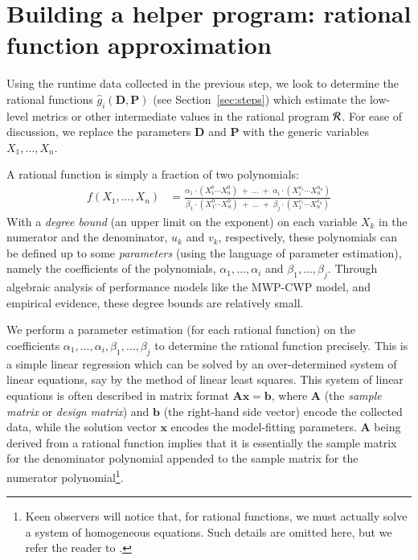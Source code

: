 \section{Building a helper program: rational function approximation}
\label{sec:paramest}

Using the runtime data collected in the previous step, 
we look to determine the rational functions
$\hat{g}_i(\bm{D},\bm{P})$ (see Section~\ref{sec:steps})
which estimate the low-level metrics or other intermediate 
values in the rational program ${\cal R}$. For ease of
discussion, we replace the parameters $\bm{D}$ and $\bm{P}$
with the generic variables $X_1,\ldots,X_n$.

A rational function is simply a fraction of two polynomials: 
{
	\small
		\begin{align}
		f(X_1,\dots,X_n) &= \frac{\alpha_1\cdot(X_1^0\cdots X_n^0) \;+\; 
			\dots \;+\;  \alpha_i\cdot(X_1^{u_1}\cdots X_n^{u_n})}{\beta_1\cdot(X_1^0\cdots X_n^0) \;+\;
			\dots \;+\; \beta_j\cdot(X_1^{v_1}\cdots X_n^{v_n})}
		\end{align}
}
With a \textit{degree bound} (an upper limit on the exponent) on each
variable $X_k$ in the numerator and the denominator,
$u_k$ and $v_k$, respectively, these polynomials can be defined up to
some \textit{parameters} (using the language of parameter estimation), namely the coefficients of the polynomials,
$\alpha_1,\dots,\alpha_i$ and $\beta_1,\dots,\beta_j$.
Through algebraic analysis of performance models 
like the MWP-CWP model, and empirical evidence, these degree bounds are relatively small.

We perform a parameter estimation (for each rational function)
on the coefficients $\alpha_1, \ldots, \alpha_i, \beta_1, \ldots, \beta_j$
to determine the rational function precisely. 
This is a simple linear regression 
which can be solved by an over-determined
system of linear equations,
say by the method of linear least squares.
%
%
%
This system of linear equations is often described in matrix format  $\mathbf{Ax} = \mathbf{b}$,
where $\mathbf{A}$ (the \textit{sample matrix} or \textit{design matrix}) and 
$\mathbf{b}$ (the right-hand side vector)
encode the collected data, while the solution vector 
$\mathbf{x}$ encodes the 
model-fitting parameters. $\mathbf{A}$ being derived from a rational function 
implies that it is essentially the sample matrix for the denominator polynomial appended to
the sample matrix for the numerator polynomial\footnote{Keen observers 
will notice that, for rational functions,
we must actually solve a system of homogeneous equations.
Such details are omitted here, but we refer the reader to \cite[Chapter 5]{brandt2018high}.}.

